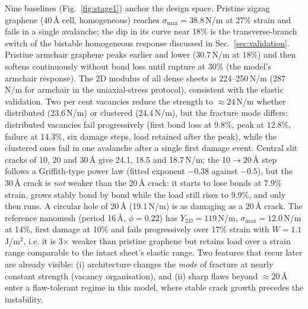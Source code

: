 Nine baselines (Fig.~\ref{fig:stage1}) anchor the design space. Pristine zigzag graphene (40\,\AA{} cell, homogeneous) reaches $\sigma_\mathrm{max}=38.8$\,N/m at 27\% strain and fails in a single avalanche; the dip in its curve near 18\% is the transverse-branch switch of the bistable homogeneous response discussed in Sec.~\ref{sec:validation}. Pristine armchair graphene peaks earlier and lower ($30.7$\,N/m at 18\%) and then softens continuously without bond loss until rupture at 30\% (the model's armchair response). The 2D modulus of all dense sheets is 224--250\,N/m ($287$\,N/m for armchair in the uniaxial-stress protocol), consistent with the elastic validation. Two per cent vacancies reduce the strength to $\approx24$\,N/m whether distributed (23.6\,N/m) or clustered (24.4\,N/m), but the fracture mode differs: distributed vacancies fail progressively (first bond loss at 9.8\%, peak at 12.8\%, failure at 14.3\%, six damage steps, load retained after the peak), while the clustered ones fail in one avalanche after a single first damage event. Central slit cracks of 10, 20 and 30\,\AA{} give 24.1, 18.5 and 18.7\,N/m; the 10$\to$20\,\AA{} step follows a Griffith-type power law (fitted exponent $-0.38$ against $-0.5$), but the 30\,\AA{} crack is \emph{not} weaker than the 20\,\AA{} crack: it starts to lose bonds at 7.9\% strain, grows stably bond by bond while the load still rises to 9.9\%, and only then runs. A circular hole of 20\,\AA{} (19.1\,N/m) is as damaging as a 20\,\AA{} crack. The reference nanomesh (period 16\,\AA, $\phi=0.22$) has $Y_{2D}=119$\,N/m, $\sigma_\mathrm{max}=12.0$\,N/m at 14\%, first damage at 10\% and fails progressively over 17\% strain with $W=1.1$\,J/m$^2$, i.e. it is 3$\times$ weaker than pristine graphene but retains load over a strain range comparable to the intact sheet's elastic range. Two features that recur later are already visible: (i) architecture changes the \emph{mode} of fracture at nearly constant strength (vacancy organisation), and (ii) sharp flaws beyond $\approx$20\,\AA{} enter a flaw-tolerant regime in this model, where stable crack growth precedes the instability.
